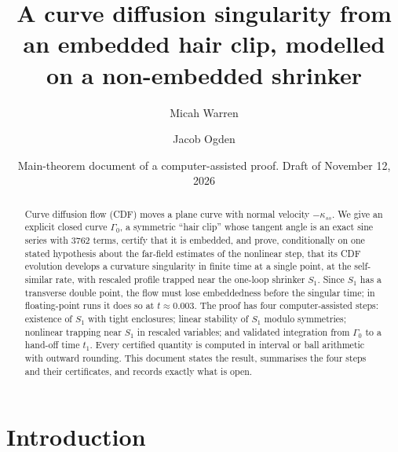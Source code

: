 \documentclass[11pt]{amsart}
\title[CDF singularity from an embedded hair clip]{A curve diffusion singularity from an embedded hair clip, modelled on a non-embedded shrinker}
\author{Micah Warren}
\author{Jacob Ogden}
\date{Main-theorem document of a computer-assisted proof. Draft of November 12, 2026}
\theoremstyle{definition}
\theoremstyle{remark}
\begin{document}
\begin{abstract}
Curve diffusion flow (CDF) moves a plane curve with normal velocity $-\kappa_{ss}$. We give an explicit closed curve $\Gamma_0$, a symmetric ``hair clip'' whose tangent angle is an exact sine series with $3762$ terms, certify that it is embedded, and prove, conditionally on one stated hypothesis about the far-field estimates of the nonlinear step, that its CDF evolution develops a curvature singularity in finite time at a single point, at the self-similar rate, with rescaled profile trapped near the one-loop shrinker $S_1$. Since $S_1$ has a transverse double point, the flow must lose embeddedness before the singular time; in floating-point runs it does so at $t\approx0.003$. The proof has four computer-assisted steps: existence of $S_1$ with tight enclosures; linear stability of $S_1$ modulo symmetries; nonlinear trapping near $S_1$ in rescaled variables; and validated integration from $\Gamma_0$ to a hand-off time $t_1$. Every certified quantity is computed in interval or ball arithmetic with outward rounding. This document states the result, summarises the four steps and their certificates, and records exactly what is open.
\end{abstract}
\maketitle

\begin{center}\end{center}

\section{Introduction}\label{s:intro}
\end{document}
